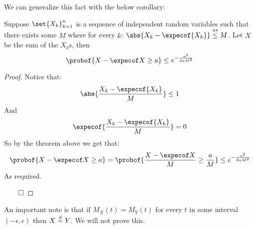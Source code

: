 We can generalize this fact with the below corollary:

\begin{coro*}

	Suppose $\set{X_k}_{k=1}^n$ is a sequence of independent random variables such that there exists some $M$ where for every $k$:
	$\abs{X_k-\expecof{X_k}}\asleq M$.
	Let $X$ be the sum of the $X_k$s, then
	\[ \probof{X-\expecof X\geq a}\leq e^{-\frac{a^2}{2nM^2}} \]

\end{coro*}

\begin{proof}

	Notice that:
	\[ \abs{\frac{X_k-\expecof{X_k}}M}\leq 1 \]
	And
	\[ \expecof{\frac{X_k-\expecof{X_k}}M} = 0 \]
	So by the theorem above we get that:
	\[ \probof{X-\expecof X\geq a} = \probof{\frac{X-\expecof X}M\geq\frac aM} \leq e^{-\frac{a^2}{2nM^2}} \]
	As required.

	\hfill$\qed$

\end{proof}

\begin{note}

	An important note is that if $M_X(t)=M_Y(t)$ for every $t$ in some interval $(-\epsilon, \epsilon)$ then $X\mathrel{\overset d=} Y$.
	We will not prove this.

\end{note}


